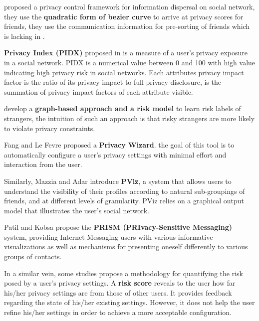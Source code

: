 
\cite{b.s._privacy_2015} proposed a privacy control framework for information dispersal on social network,
	they use the \textbf{quadratic form of bezier curve} to arrive at privacy scores for friends,
	they use the communication information for pre-sorting of friends which is lacking in \cite{vidyalakshmi_privacy_2015}.

\textbf{Privacy Index (PIDX)} proposed in \cite{nepali_sonet_2013} is a measure of a user’s privacy exposure in a social network.
PIDX is a numerical value between 0 and 100 with high value indicating high privacy risk in social networks.
Each attributes privacy impact factor is the ratio of its privacy impact to full privacy disclosure,
	is the summation of privacy impact factors of each attribute visible.


\cite{akcora_risks_2012} develop a \textbf{graph-based approach and a risk model} to learn risk labels of strangers,
	the intuition of such an approach is that risky strangers are more likely to violate privacy constraints.

Fang and Le Fevre \cite{fang_privacy_2010} proposed a \textbf{Privacy Wizard}.
	the goal of this tool is to automatically configure a user’s privacy settings with minimal effort and interaction from the user.

Similarly,
	Mazzia and Adar \cite{mazzia_pviz_2012} introduce \textbf{PViz},
	a system that allows users to understand the visibility of their profiles according to natural sub-groupings of friends,
	and at different levels of granularity.
PViz relies on a graphical output model that illustrates the user’s social network.

Patil and Kobsa \cite{patil_enhancing_2010} propose the \textbf{PRISM (PRIvacy-Sensitive Messaging)} system,
	providing Internet Messaging users with various informative visualizations as well as mechanisms for presenting oneself differently to various groups of contacts.

In a similar vein,
	some studies \cite{maximilien_privacyasaservice_2009} propose a methodology for quantifying the risk posed by a user’s privacy settings.
A \textbf{risk score} reveals to the user how far his/her privacy settings are from those of other users.
It provides feedback regarding the state of his/her existing settings.
However,
	it does not help the user refine his/her settings in order to achieve a more acceptable configuration.

